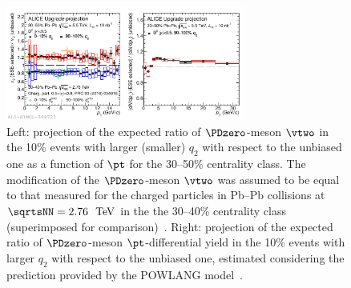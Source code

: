 \begin{figure}[ht]
  \begin{center}
    \includegraphics[width=0.7\textwidth]{hf/figures/ALICE_D0ESE_3050_upgradeprojection.pdf}
 
    \caption{Left: projection of the expected ratio of $\PDzero$-meson $\vtwo$ in the 10\% events with larger (smaller) $q_2$ with respect to the unbiased one as a function of $\pt$ for the 30--50\% centrality class. The modification of the $\PDzero$-meson $\vtwo$ was assumed to be equal to that measured for the charged particles in Pb--Pb collisions at $\sqrtsNN=2.76~{\UTeV}$ in the the 30--40\% centrality class (superimposed for comparison)~\cite{XXX}. Right: projection of the expected ratio of $\PDzero$-meson $\pt$-differential yield in the 10\% events with larger $q_2$ with respect to the unbiased one, estimated considering the prediction provided by the POWLANG model~\cite{XXX}.}
    \label{fig:ESE}
  \end{center}
\end{figure}




